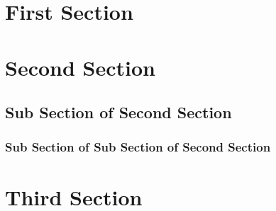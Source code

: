 \documentclass{article}
\begin{document}
    \tableofcontents %
    \section{First Section}
    \section{Second Section}
    \subsection{Sub Section of Second Section}
    \subsubsection{Sub Section of Sub Section of Second Section}
    \section{Third Section}
\end{document}
